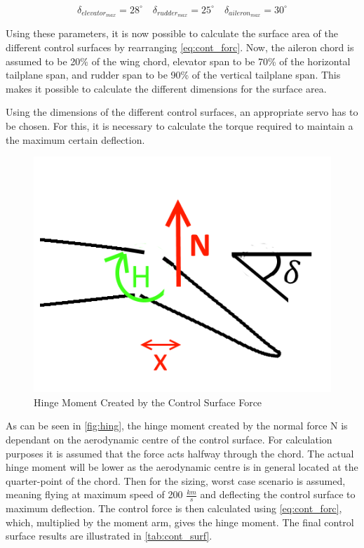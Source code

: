 \begin{equation*}
    \delta_{elevator_{max}} = 28^\circ\quad\delta_{rudder_{max}} = 25^\circ\quad\delta_{aileron_{max}} = 30 ^\circ
\end{equation*}

Using these parameters, it is now possible to calculate the surface area of the different control surfaces by rearranging \autoref{eq:cont_forc}. 
Now, the aileron chord is assumed to be 20\% of the wing chord, elevator span to be 70\% of the horizontal tailplane span, and rudder span to be 90\% of the vertical tailplane span. This makes it possible to calculate the different dimensions for the surface area. 

Using the dimensions of the different control surfaces, an appropriate servo has to be chosen. For this, it is necessary to calculate the torque required to maintain a the maximum certain deflection. 

\begin{figure}[htb]
    \centering
    \includegraphics[scale=1]{./StabilityandControl/Figures/hinge}
    \caption{Hinge Moment Created by the Control Surface Force}
    \label{fig:hing}
\end{figure}

As can be seen in \autoref{fig:hing}, the hinge moment created by the normal force N is dependant on the aerodynamic centre of the control surface. For calculation purposes it is assumed that the force acts halfway through the chord. The actual hinge moment will be lower as the aerodynamic centre is in general located at the quarter-point of the chord. Then for the sizing, worst case scenario is assumed, meaning flying at maximum speed of 200 $\frac{km}{s}$ and deflecting the control surface to maximum deflection. The control force is then calculated using \autoref{eq:cont_forc}, which, multiplied by the moment arm, gives the hinge moment. The final control surface results are illustrated in \autoref{tab:cont_surf}.

